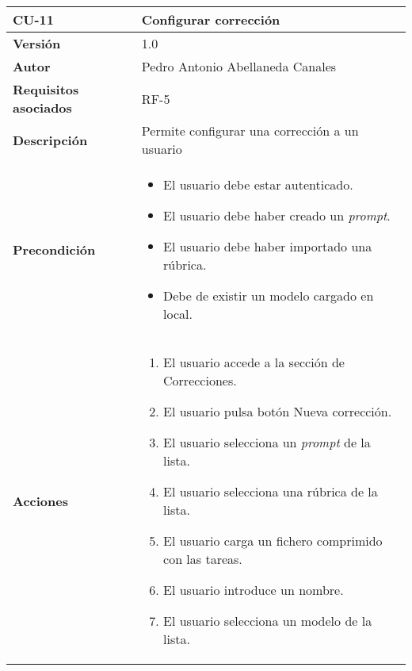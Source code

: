 \begin{table}[p]
	\centering
	\begin{tabularx}{\linewidth}{ p{} p{} }
		\toprule
		\textbf{CU-11}    & \textbf{Configurar corrección} \\
		\midrule
		\textbf{Versión}              & 1.0    \\
		\textbf{Autor}                & Pedro Antonio Abellaneda Canales \\
		\textbf{Requisitos asociados} & RF-5 \\
		\textbf{Descripción}          & Permite configurar una corrección a un usuario \\
		\textbf{Precondición}         & \begin{itemize}
                                        \tightlist
		                                  \item El usuario debe estar autenticado.
		                                  \item El usuario debe haber creado un \textit{prompt}.
		                                  \item El usuario debe haber importado una rúbrica.
		                                  \item Debe de existir un modelo cargado en local.
		                                 \end{itemize} \\
		\textbf{Acciones}             &
                            		\begin{enumerate}
                            			\def\labelenumi{\arabic{enumi}.}
                            			\tightlist
                            			\item El usuario accede a la sección de Correcciones.
                                        \item El usuario pulsa botón Nueva corrección.
                            			\item El usuario selecciona un \textit{prompt} de la lista.
                            			\item El usuario selecciona una rúbrica de la lista.
                            			\item El usuario carga un fichero comprimido con las tareas.
                                        \item El usuario introduce un nombre.
                                        \item El usuario selecciona un modelo de la lista.

\end{enumerate}
\end{tabularx}
\end{table}
